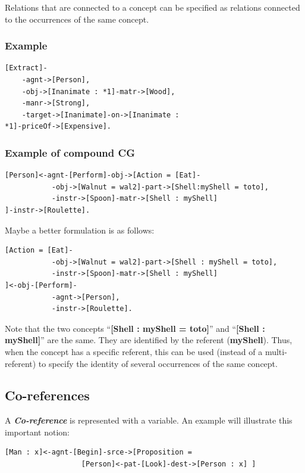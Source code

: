 \documentclass{book}
\begin{document}
Relations that are connected to a concept
can be specified as relations connected to the occurrences of the
same concept.

\subsubsection{Example}

\begin{verbatim}
[Extract]-
    -agnt->[Person],
    -obj->[Inanimate : *1]-matr->[Wood],
    -manr->[Strong],
    -target->[Inanimate]-on->[Inanimate :
*1]-priceOf->[Expensive].
\end{verbatim}

\subsubsection{Example of compound CG}

\begin{verbatim}
[Person]<-agnt-[Perform]-obj->[Action = [Eat]-
           -obj->[Walnut = wal2]-part->[Shell:myShell = toto],
           -instr->[Spoon]-matr->[Shell : myShell]
]-instr->[Roulette].
\end{verbatim}

Maybe a better formulation is as follows:

\begin{verbatim}
[Action = [Eat]-
           -obj->[Walnut = wal2]-part->[Shell : myShell = toto],
           -instr->[Spoon]-matr->[Shell : myShell]
]<-obj-[Perform]-
           -agnt->[Person],
           -instr->[Roulette].
\end{verbatim}

Note that the two concepts ``{\bf [Shell : myShell = toto]}'' and
``{\bf [Shell : myShell]}'' are the same. They are identified by the
referent ({\bf myShell}). Thus, when the concept has a specific
referent, this can be used (instead of a multi-referent) to specify
the identity of several occurrences of the same concept.

\subsection{Co-references}

A {\it {\bf Co-reference}} is represented with a
variable. An example will illustrate this important notion:


\begin{verbatim}
[Man : x]<-agnt-[Begin]-srce->[Proposition = 
                  [Person]<-pat-[Look]-dest->[Person : x] ]
\end{verbatim}
\end{document}
